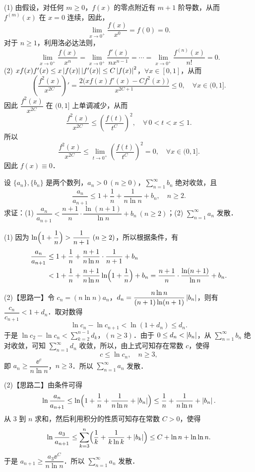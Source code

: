 \begin{solution}
(1) 由假设，对任何 $m\ge 0$，$f(x)$ 的零点附近有 $m+1$ 阶导数，从而 $f^{(m)}(x)$ 在 $x=0$ 连续，因此，
\[
  \lim_{x\to 0^{+}}\frac{f(x)}{x^{0}}=f(0)=0.
\]
对于 $n\ge 1$，利用洛必达法则，
\[
  \lim_{x\to 0^{+}}\frac{f(x)}{x^{n}}
  =\lim_{x\to 0^{+}}\frac{f'(x)}{nx^{n-1}}
  =\cdots=\lim_{x\to 0^{+}}\frac{f^{(n)}(x)}{n!}=0.
\]
(2) $xf(x)f'(x)\le x\left|f(x)\right|\left|f'(x)\right|\le C\left|f(x)\right|^{2}$，$\forall x\in[0,1]$，从而
\[
  \left(\frac{f^{2}(x)}{x^{2C}}\right)'
  =\frac{2\bigl(xf(x)f'(x)-Cf^{2}(x)\bigr)}{x^{2C+1}}\le 0,
  \quad \forall x\in(0,1].
\]
因此 $\dfrac{f^{2}(x)}{x^{2C}}$ 在 $(0,1]$ 上单调减少，从而
\[
  \frac{f^{2}(x)}{x^{2C}}\le \left(\frac{f(t)}{t^{C}}\right)^{2},
  \quad \forall\, 0<t<x\le 1.
\]
所以
\[
  \frac{f^{2}(x)}{x^{2C}}\le \lim_{t\to 0^{+}}\left(\frac{f(t)}{t^{C}}\right)^{2}=0,
  \quad \forall x\in(0,1].
\]
因此 $f(x)\equiv 0$．
\end{solution}

设 $\{a_{n}\},\{b_{n}\}$ 是两个数列，$a_{n}>0\ (n\ge 0)$，$\sum\limits_{n=1}^{\infty}b_{n}$ 绝对收敛，且
\[
  \frac{a_{n}}{a_{n+1}}\le 1+\frac{1}{n}+\frac{1}{n\ln n}+b_{n},\quad n\ge 2.
\]
求证：(1) $\dfrac{a_{n}}{a_{n+1}}<\dfrac{n+1}{n}\cdot\dfrac{\ln(n+1)}{\ln n}+b_{n}\ (n\ge 2)$；(2) $\sum\limits_{n=1}^{\infty}a_{n}$ 发散．

\begin{solution}
(1) 因为 $\ln\Bigl(1+\dfrac{1}{n}\Bigr)>\dfrac{1}{n+1}\ (n\ge 2)$，所以根据条件，有
\begin{align*}
  \frac{a_{n}}{a_{n+1}}
  &\le 1+\frac{1}{n}+\frac{n+1}{n\ln n}\cdot\frac{1}{n+1}+b_{n}\\
  &<1+\frac{1}{n}+\frac{n+1}{n\ln n}\ln\Bigl(1+\frac{1}{n}\Bigr)+b_{n}
  =\frac{n+1}{n}\cdot\frac{\ln(n+1)}{\ln n}+b_{n}.
\end{align*}

(2)【思路一】令 $c_{n}=(n\ln n)a_{n}$，$d_{n}=\dfrac{n\ln n}{(n+1)\ln(n+1)}\left|b_{n}\right|$，则有 $\dfrac{c_{n}}{c_{n+1}}<1+d_{n}$．取对数得
\[
  \ln c_{n}-\ln c_{n+1}<\ln(1+d_{n})\le d_{n}.
\]
于是 $\ln c_{2}-\ln c_{n}<\sum\limits_{k=2}^{n-1}d_{k}$，$(n\ge 3)$．由于 $0\le d_{n}<\left|b_{n}\right|$，从 $\sum\limits_{n=1}^{\infty}b_{n}$ 绝对收敛，可知 $\sum\limits_{n=1}^{\infty}d_{n}$ 收敛，所以，由上式可知存在常数 $c$，使得
\[
  c\le \ln c_{n},\quad n\ge 3,
\]
即 $a_{n}\ge \dfrac{\ee^{c}}{n\ln n}$，$n\ge 3$．所以 $\sum\limits_{n=1}^{\infty}a_{n}$ 发散．

(2)【思路二】由条件可得
\[
  \ln\frac{a_{n}}{a_{n+1}}
  \le \ln\Bigl(1+\frac{1}{n}+\frac{1}{n\ln n}+\left|b_{n}\right|\Bigr)
  \le \frac{1}{n}+\frac{1}{n\ln n}+\left|b_{n}\right|.
\]
从 $3$ 到 $n$ 求和，然后利用积分的性质可知存在常数 $C>0$，使得
\[
  \ln\frac{a_{3}}{a_{n+1}}
  \le \sum_{k=3}^{n}\Bigl(\frac{1}{k}+\frac{1}{k\ln k}+\left|b_{k}\right|\Bigr)
  \le C+\ln n+\ln\ln n.
\]
于是 $a_{n+1}\ge \dfrac{a_{3}\ee^{C}}{n\ln n}$．所以 $\sum\limits_{n=1}^{\infty}a_{n}$ 发散．
\end{solution}

